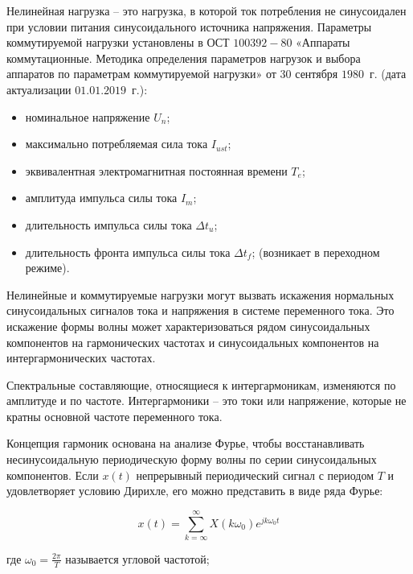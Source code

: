 Нелинейная нагрузка – это нагрузка, в которой ток потребления не синусоидален при условии питания синусоидального источника напряжения.
Параметры коммутируемой нагрузки установлены в ОСТ $1 00392 - 80$  «Аппараты коммутационные. Методика определения параметров нагрузок и выбора аппаратов по параметрам коммутируемой нагрузки» от $30$   сентября $1980$~г. (дата актуализации  $01.01.2019$~г.):

\begin{itemize}
	\item номинальное напряжение $U_n$;
	
	\item максимально потребляемая сила тока $I_{ust}$;
	
	\item эквивалентная электромагнитная постоянная времени $T_{e}$;
	
	\item амплитуда импульса силы тока $I_m$;
	
	\item длительность импульса силы тока  $\varDelta t_u$;
	
	\item длительность фронта импульса силы тока $\varDelta t_f$;  (возникает в переходном режиме).
\end{itemize}

Нелинейные и коммутируемые нагрузки могут вызвать искажения нормальных синусоидальных сигналов тока и напряжения в системе переменного тока. Это искажение формы волны может характеризоваться рядом синусоидальных компонентов на гармонических частотах и синусоидальных компонентов на интергармонических частотах.
 
Спектральные составляющие, относящиеся к интергармоникам, изменяются по амплитуде и по частоте. Интергармоники – это токи или напряжение, которые не кратны основной частоте переменного тока.

Концепция гармоник основана на анализе Фурье, чтобы восстанавливать несинусоидальную периодическую форму волны по серии синусоидальных компонентов. Если $x(t)$  непрерывный периодический сигнал с периодом $T$   и удовлетворяет условию Дирихле, его можно представить в виде ряда Фурье:

\begin{equation}
	\label{eq:equation1}
x(t) = \displaystyle\sum_{k=\infty}^{\infty} X(k \omega_{0}) e^{jk \omega_{0} t}
\end{equation}

где $\omega_0 = \frac{2 \pi}{T}$  называется угловой частотой;
 
